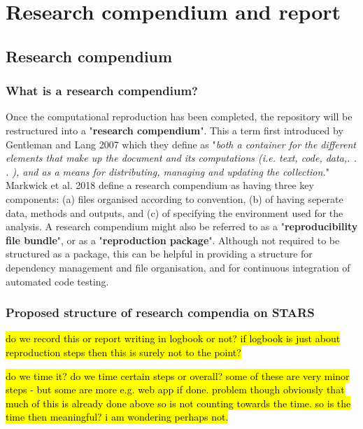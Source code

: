 \section{Research compendium and report}

\subsection{Research compendium} \label{sec:compendium}

\subsubsection{What is a research compendium?}

Once the computational reproduction has been completed, the repository will be restructured into a "\textbf{research compendium}". This a term first introduced by Gentleman and Lang 2007\autocite{gentleman_statistical_2007} which they define as "\textit{both a container for the different elements that make up the document and its computations (i.e. text, code, data,. . . ), and as a means for distributing, managing and updating the collection.}"\autocite{gentleman_statistical_2007} Markwick et al. 2018 define a research compendium as having three key components: (a) files organised according to convention, (b) of having seperate data, methods and outputs, and (c) of specifying the environment used for the analysis.\autocite{marwick_packaging_2018} A research compendium might also be referred to as a "\textbf{reproducibility file bundle}",\autocite{arguillas_10_2022} or as a "\textbf{reproduction package}".\autocite{krafczyk_learning_2021} Although not required to be structured as a package, this can be helpful in providing a structure for dependency management and file organisation, and for continuous integration of automated code testing.\autocite{marwick_packaging_2018}

\subsubsection{Proposed structure of research compendia on STARS}
\logno

\hl{do we record this or report writing in logbook or not? if logbook is just about reproduction steps then this is surely not to the point?}

\hl{do we time it? do we time certain steps or overall? some of these are very minor steps - but some are more e.g. web app if done. problem though obviously that much of this is already done above so is not counting towards the time. so is the time then meaningful? i am wondering perhaps not.}


